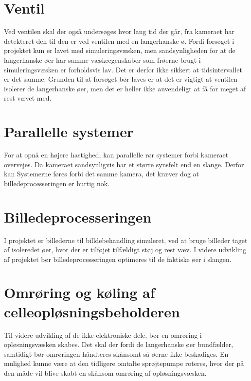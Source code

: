 \section{Ventil}
Ved ventilen skal der også undersøges hvor lang tid der går, fra kameraet har detekteret den til den er ved ventilen med en langerhanske ø. Fordi forsøget i projektet kun er lavet med simuleringsvæsken, men sandsynligheden for at de langerhanske øer har samme væskeegenskaber som frøerne brugt i simuleringsvæsken er forholdsvis lav. Det er derfor ikke sikkert at tidsintervallet er det samme. Grunden til at forsøget bør laves er at det er vigtigt at ventilen isolerer de langerhanske øer, men det er heller ikke anvendeligt at få for meget af rest vævet med.

\section{Parallelle systemer}
For at opnå en højere hastighed, kan parallelle rør systemer forbi kameraet overvejes.
Da kameraet sandsynligvis har et større synsfelt end en slange. Derfor kan Systemerne føres forbi det samme kamera, det kræver dog at billedeprocesseringen er hurtig nok.

\section{Billedeprocesseringen}
I projektet er billederne til billdebehandling simuleret, ved at bruge billeder taget af isoleredet øer, hvor der er tilføjet tilfældigt støj og rest væv. I videre udvikling af projektet bør billedeprocesseringen optimeres til de faktiske øer i slangen. 

\section{Omrøring og køling af celleopløsningsbeholderen}
Til videre udvikling af de ikke-elektroniske dele, bør en omrøring i opløsningsvæsken skabes. Det skal der fordi de langerhanske øer bundfælder, samtidigt bør omrøringen håndteres skånsomt så øerne ikke beskadiges. En mulighed kunne være at den tidligere omtalte sprøjtepumpe roteres, hvor der på den måde vil blive skabt en skånsom omrøring af opløsningsvæsken.

